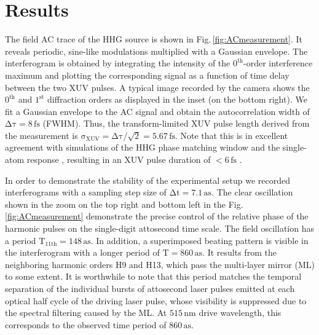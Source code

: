 \documentclass[fleqn,10pt]{wlscirep}
\begin{document}
\section{Results}

The field AC trace of the HHG source is shown in Fig.\,\ref{fig:ACmeasurement}. It reveals periodic, sine-like modulations multiplied with a Gaussian envelope. The interferogram is obtained by integrating the intensity of the $\mathrm{0^{th}}$-order interference maximum and plotting the corresponding signal as a function of time delay between the two XUV pulses. A typical image recorded by the camera shows the $\mathrm{0^{th}}$ and $\mathrm{1^{st}}$ diffraction orders as displayed in the inset (on the bottom right). We fit a Gaussian envelope to the AC signal and obtain the autocorrelation width of $\mathrm{\Delta\tau = 8\,fs}$ (FWHM). Thus, the transform-limited XUV pulse length derived from the measurement is $\mathrm{\sigma_{XUV}=\Delta\tau/\sqrt{2} = 5.67\,fs}$. Note that this is in excellent agreement with simulations of the HHG phase matching window \cite{Constant1999} and the single-atom response \cite{Lewenstein1994}, resulting in an XUV pulse duration of $\mathrm{<6\,fs}$ \cite{Klas2021}.

\newpage
In order to demonstrate the stability of the experimental setup we recorded interferograms with a sampling step size of $\mathrm{\Delta t=7.1\,as}$. The clear oscillation shown in the zoom on the top right and bottom left in the Fig.\,\ref{fig:ACmeasurement} demonstrate the precise control of the relative phase of the harmonic pulses on the single-digit attosecond time scale. The field oscillation has a period $\mathrm{T_{11th}=148\,as}$. In addition, a superimposed beating pattern is visible in the interferogram with a longer period of $\mathrm{T=860\,as}$. It results from the neighboring harmonic orders H9 and H13, which pass the multi-layer mirror (ML) to some extent. It is worthwhile to note that this period matches the temporal separation of the individual bursts of attosecond laser pulses emitted at each optical half cycle of the driving laser pulse, whose visibility is suppressed due to the spectral filtering caused by the ML. At $\mathrm{515\,nm}$ drive wavelength, this corresponds to the observed time period of $\mathrm{860\,as}$.\\   
\end{document}
